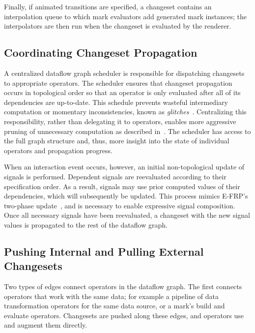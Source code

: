 Finally, if animated transitions are specified, a changeset contains an
interpolation queue to which mark evaluators add generated mark instances; the
interpolators are then run when the changeset is evaluated by the renderer.

\vspace{-10pt}

\subsection{Coordinating Changeset Propagation}
\label{sec:propagation}

\vspace{-7pt}

A centralized dataflow graph scheduler is responsible for dispatching changesets
to appropriate operators. The scheduler ensures that changeset propagation
occurs in topological order so that an operator is only evaluated after all of
its dependencies are up-to-date. This schedule prevents wasteful intermediary
computation or momentary inconsistencies, known as
\emph{glitches}~\cite{cooper:embedding}. Centralizing this responsibility,
rather than delegating it to operators, enables more aggressive pruning of
unnecessary computation as described in~. The scheduler has
access to the full graph structure and, thus, more insight into the state of
individual operators and propagation progress.

When an interaction event occurs, however, an initial non-topological update of
signals is performed. Dependent signals are reevaluated according to their
specification order. As a result, signals may use prior computed values of their
dependencies, which will subsequently be updated. This process mimics E-FRP's
two-phase update~\cite{wan:efrp}, and is necessary to enable expressive signal
composition. Once all necessary signals have been reevaluated, a changeset with
the new signal values is propagated to the rest of the dataflow graph.

\subsection{Pushing Internal and Pulling External Changesets}

\vspace{-7pt}

Two types of edges connect operators in the dataflow graph. The first connects
operators that work with the same data; for example a pipeline of data
transformation operators for the same data source, or a mark's build and
evaluate operators. Changesets are pushed along these edges, and operators
use and augment them directly.

